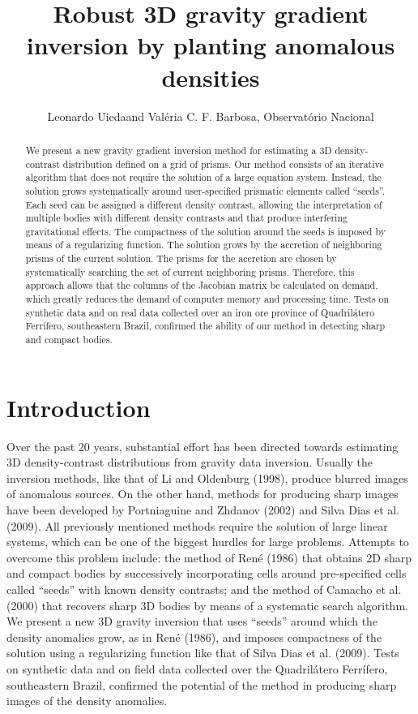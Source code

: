 \documentclass{segabs}
\title{Robust 3D gravity gradient inversion by planting anomalous densities}
\author{Leonardo Uieda\footnotemark[1] and Val\'eria C. F. Barbosa, Observat\'orio Nacional}
\begin{document}
\maketitle

\begin{abstract}
We present a new gravity gradient inversion method for estimating a 3D density-contrast
distribution defined on a grid of prisms. Our method consists of
an iterative algorithm that does not require the solution of a large equation system.
Instead, the solution grows systematically around user-specified prismatic elements
called ``seeds''. Each seed can be assigned a different density contrast, allowing the
interpretation of multiple bodies with different density contrasts and that produce interfering
gravitational effects. The compactness of the solution around the seeds is imposed
by means of a regularizing function.
The solution grows by the accretion of neighboring prisms of the current solution. The prisms
for the accretion are chosen by systematically searching the set of current neighboring
prisms. Therefore, this approach allows that the columns of the Jacobian matrix be
calculated on demand, which greatly reduces the demand of computer memory and processing
time. Tests on synthetic data and on real data collected over an iron ore province of
Quadril\'atero Ferr\'ifero, southeastern Brazil, confirmed the ability of our
method in detecting sharp and compact bodies.
\end{abstract}

\vspace{-0.5cm}
\section{Introduction}

\begin{sloppypar}
Over the past 20 years, substantial effort has been directed towards estimating
3D density-contrast distributions from gravity data inversion. Usually the inversion
methods, like that of Li and Oldenburg (1998), produce blurred images of anomalous
sources. On the other hand, methods for producing sharp images have been developed
by Portniaguine and Zhdanov (2002) and Silva Dias et al. (2009). All
previously mentioned methods require the solution of large linear systems, which can
be one of the biggest hurdles for large problems. Attempts to overcome this problem
include: the method of Ren\'e (1986) that obtains 2D sharp and compact bodies by successively
incorporating cells around pre-specified cells called ``seeds'' with known density
contrasts; and the method of Camacho et al. (2000) that recovers sharp 3D
bodies by means of a systematic search algorithm. We present a new 3D gravity inversion
that uses ``seeds'' around which the density anomalies grow, as in Ren\'e (1986), and
imposes compactness of the solution using a regularizing function like that of Silva
Dias et al. (2009). Tests on synthetic data and on field data collected over
the Quadril\'atero Ferr\'ifero, southeastern Brazil, confirmed the potential of the method in
producing sharp images of the density anomalies.
\end{sloppypar}
\end{document}
